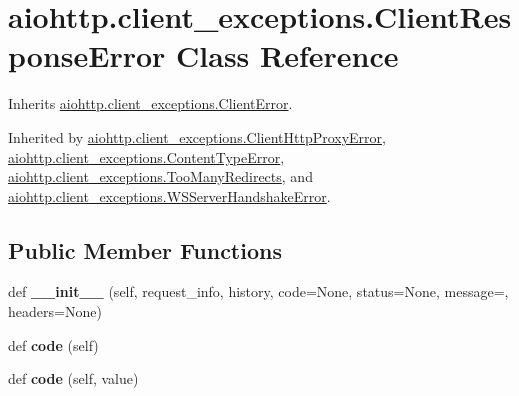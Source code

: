 \hypertarget{classaiohttp_1_1client__exceptions_1_1_client_response_error}{}\section{aiohttp.\+client\+\_\+exceptions.\+Client\+Response\+Error Class Reference}
\label{classaiohttp_1_1client__exceptions_1_1_client_response_error}


Inherits \hyperlink{classaiohttp_1_1client__exceptions_1_1_client_error}{aiohttp.\+client\+\_\+exceptions.\+Client\+Error}.



Inherited by \hyperlink{classaiohttp_1_1client__exceptions_1_1_client_http_proxy_error}{aiohttp.\+client\+\_\+exceptions.\+Client\+Http\+Proxy\+Error}, \hyperlink{classaiohttp_1_1client__exceptions_1_1_content_type_error}{aiohttp.\+client\+\_\+exceptions.\+Content\+Type\+Error}, \hyperlink{classaiohttp_1_1client__exceptions_1_1_too_many_redirects}{aiohttp.\+client\+\_\+exceptions.\+Too\+Many\+Redirects}, and \hyperlink{classaiohttp_1_1client__exceptions_1_1_w_s_server_handshake_error}{aiohttp.\+client\+\_\+exceptions.\+W\+S\+Server\+Handshake\+Error}.

\subsection*{Public Member Functions}
\begin{DoxyCompactItemize}
\item 
\mbox{\label{classaiohttp_1_1client__exceptions_1_1_client_response_error_ad7809ccfbf1ec128ece48ae4af73cf2c}} 
def {\bfseries \+\_\+\+\_\+init\+\_\+\+\_\+} (self, request\+\_\+info, history, code=None, status=None, message=\textquotesingle{}\textquotesingle{}, headers=None)
\item 
\mbox{\label{classaiohttp_1_1client__exceptions_1_1_client_response_error_a0384f39af84c2b16ad8a9815ade15995}} 
def {\bfseries code} (self)
\item 
\mbox{\label{classaiohttp_1_1client__exceptions_1_1_client_response_error_aac4d3baf87dbf34bb3ce1f47b79936e9}} 
def {\bfseries code} (self, value)
\end{DoxyCompactItemize}
